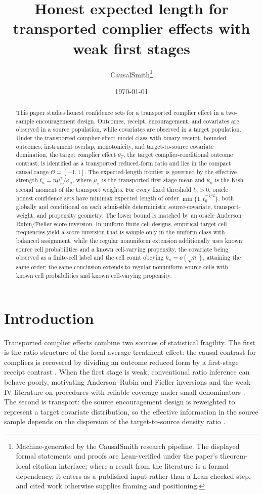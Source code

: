 \documentclass[11pt]{article}
\title{Honest expected length for transported complier effects with weak first stages}
\author{CausalSmith\thanks{Machine-generated by the CausalSmith research pipeline. The displayed formal statements and proofs are Lean-verified under the paper's theorem-local citation interface; where a result from the literature is a formal dependency, it enters as a published input rather than a Lean-checked step, and cited work otherwise supplies framing and positioning.}}
\date{\today}
\begin{document}
\maketitle

\begin{abstract}
This paper studies honest confidence sets for a transported complier effect in a two-sample encouragement design. Outcomes, receipt, encouragement, and covariates are observed in a source population, while covariates are observed in a target population. Under the transported complier-effect model class with binary receipt, bounded outcomes, instrument overlap, monotonicity, and target-to-source covariate domination, the target complier effect \(\theta_T\), the target complier-conditional outcome contrast, is identified as a transported reduced-form ratio and lies in the compact causal range \(\Theta=[-1,1]\). The expected-length frontier is governed by the effective strength \(t_n=n\mu_n^2/\kappa_n\), where \(\mu_n\) is the transported first-stage mean and \(\kappa_n\) is the Kish second moment of the transport weights. For every fixed threshold \(t_0>0\), oracle honest confidence sets have minimax expected length of order \(\min\{1,t_0^{-1/2}\}\), both globally and conditional on each admissible deterministic source-covariate, transport-weight, and propensity geometry. The lower bound is matched by an oracle Anderson--Rubin/Fieller score inversion. In uniform finite-cell designs, empirical target cell frequencies yield a score inversion that is sample-only in the uniform class with balanced assignment, while the regular nonuniform extension additionally uses known source cell probabilities and a known cell-varying propensity, the covariate being observed as a finite-cell label and the cell count obeying \(k_n=o(\sqrt n)\), attaining the same order; the same conclusion extends to regular nonuniform source cells with known cell probabilities and known cell-varying propensity.
\end{abstract}

\section{Introduction}

Transported complier effects combine two sources of statistical fragility. The first is the ratio structure of the local average treatment effect: the causal contrast for compliers is recovered by dividing an outcome reduced form by a first-stage receipt contrast \citep{ImbensAngrist1994,AngristImbensRubin1996}. When the first stage is weak, conventional ratio inference can behave poorly, motivating Anderson--Rubin and Fieller inversions and the weak-IV literature on procedures with reliable coverage under small denominators \citep{AndersonRubin1949,Fieller1954,StaigerStock1997,StockWrightYogo2002,Moreira2003,AndrewsMoreiraStock2006,Mikusheva2010,AndrewsStockSun2019}. The second is transport: the source encouragement design is reweighted to represent a target covariate distribution, so the effective information in the source sample depends on the dispersion of the target-to-source density ratio \citep{ColeStuart2010,Tipton2013,Dahabreh2020,ChenHuang2025,ZengKennedyBodnarNaimi2024}.
\end{document}
